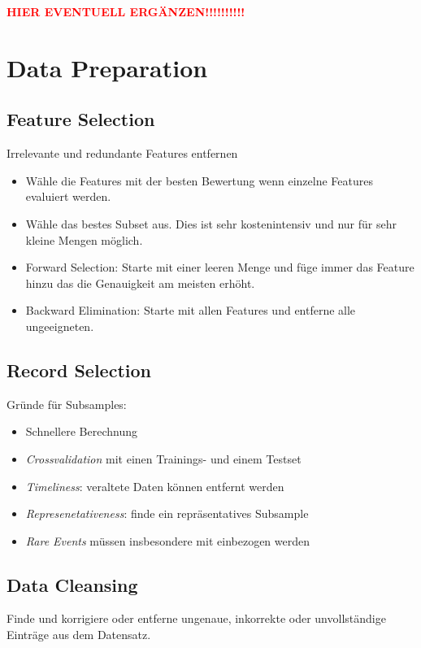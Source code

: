 \documentclass[a4paper]{scrartcl}
\begin{document}
\textbf{\textcolor{red}{HIER EVENTUELL ERGÄNZEN!!!!!!!!!!}}

\section{Data Preparation}
\subsection{Feature Selection}
Irrelevante und redundante Features entfernen
\begin{itemize}
\setlength{\parskip}{0pt}
\item Wähle die Features mit der besten Bewertung wenn einzelne Features evaluiert werden.
\item Wähle das bestes Subset aus. Dies ist sehr kostenintensiv und nur für sehr kleine Mengen möglich.
\item Forward Selection: Starte mit einer leeren Menge und füge immer das Feature hinzu das die Genauigkeit am meisten erhöht.
\item Backward Elimination: Starte mit allen Features und entferne alle ungeeigneten.
\end{itemize}

\subsection{Record Selection}
Gründe für Subsamples:
\begin{itemize}
\item Schnellere Berechnung
\item \textit{Crossvalidation} mit einen Trainings- und einem Testset
\item \textit{Timeliness}: veraltete Daten können entfernt werden
\item \textit{Represenetativeness}: finde ein repräsentatives Subsample
\item \textit{Rare Events} müssen insbesondere mit einbezogen werden
\end{itemize}

\subsection{Data Cleansing}
Finde und korrigiere oder entferne ungenaue, inkorrekte oder unvollständige Einträge aus dem Datensatz.
\end{document}

